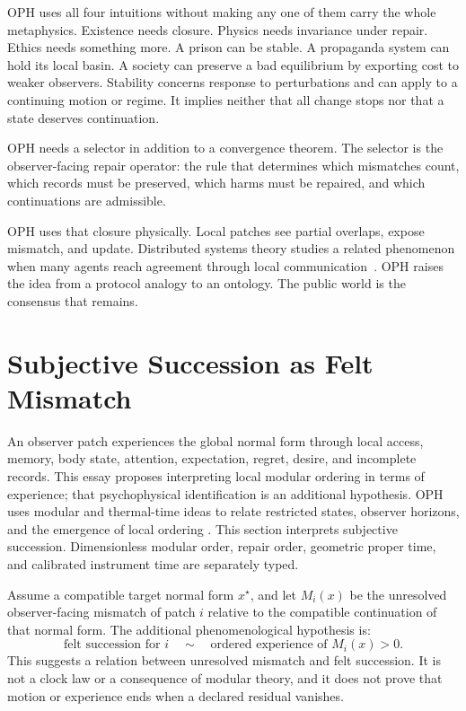\documentclass[11pt]{article}
\theoremstyle{remark}
\theoremstyle{plain}
\begin{document}
OPH uses all four intuitions without making any one of them carry the whole
metaphysics. Existence needs closure. Physics needs invariance under repair.
Ethics needs something more. A prison can be stable. A propaganda system can
hold its local basin. A society can preserve a bad equilibrium by exporting cost
to weaker observers. Stability concerns response to perturbations and can apply
to a continuing motion or regime. It implies neither that all change stops nor
that a state deserves continuation.

OPH needs a selector in addition to a convergence theorem. The
selector is the observer-facing repair operator: the rule that determines which
mismatches count, which records must be preserved, which harms must be repaired,
and which continuations are admissible.

OPH uses that closure physically. Local patches see partial overlaps, expose
mismatch, and update. Distributed systems theory
studies a related phenomenon when many agents reach agreement through local
communication~\cite{Olfati2007,Lamport1982}. OPH raises the idea from a
protocol analogy to an ontology. The public world is the consensus that remains.

\section{Subjective Succession as Felt Mismatch}

An observer patch experiences the global normal form through local access,
memory, body state, attention, expectation, regret, desire, and incomplete
records. This essay proposes interpreting local modular ordering in terms of
experience; that psychophysical identification is an additional hypothesis.
OPH uses modular and thermal-time ideas to relate restricted states,
observer horizons, and the emergence of local ordering
\cite{OPHObservers,ConnesRovelli1994,PageWootters1983}.
This section interprets subjective succession. Dimensionless modular order,
repair order, geometric proper time, and calibrated instrument time are
separately typed.

Assume a compatible target normal form \(x^\star\), and let \(M_i(x)\) be the unresolved
observer-facing mismatch of patch \(i\) relative to the compatible continuation
of that normal form. The additional phenomenological hypothesis is:
\[
\boxed{
\text{felt succession for }i \quad\sim\quad \text{ordered experience of } M_i(x)>0 .
}
\]
This suggests a relation between unresolved mismatch and felt succession. It
is not a clock law or a consequence of modular theory, and it does not prove
that motion or experience ends when a declared residual vanishes.
\end{document}
